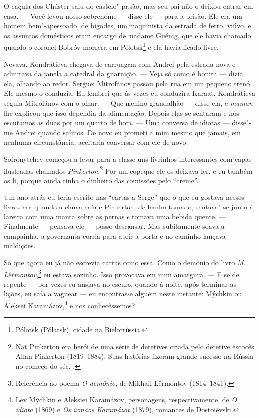 O caçula dos Chúster saiu do castelo"-prisão, mas seu pai não o deixou
entrar em casa. --- Você levou nosso sobrenome --- disse ele --- para a
prisão. Ele era um homem bem"-apessoado, de bigodes, um maquinista da
estrada de ferro, viúvo, e os assuntos domésticos eram encargo de madame
Guénig, que ele havia chamado quando o coronel Bobróv morrera em
Pólotsk\footnote{Pólotsk (Pólatsk), cidade na Bielorrússia.} e ela havia
ficado livre.

Nevava. Kondrátieva chegava de carruagem com Andrei pela estrada nova e
admirava da janela a catedral da guarnição. --- Veja só como é bonita
--- dizia ela, olhando ao redor. Serguei Mitrofánov passou pela rua em
um pequeno trenó. Ele mesmo o conduzia. Eu lembrei que às vezes eu
conduzira Karaat. Kondrátieva seguia Mitrofánov com o olhar. --- Que
menino grandalhão --- disse ela, e \emph{maman} lhe explicou que isso
dependia da alimentação. Depois elas se sentaram e nós escutamos as duas
por um quarto de hora. --- Uma conversa de idiotas --- disse"-me Andrei
quando saímos. De novo eu prometi a mim mesmo que jamais, em nenhuma
circunstância, aceitaria conversar com ele de novo.

Sofrónytchev começou a levar para a classe uns livrinhos interessantes
com capas ilustradas chamados \emph{Pinkerton}.\footnote{Nat Pinkerton
  era herói de uma série de detetives criada pelo detetive escocês Allan
  Pinkerton (1819--1884). Suas histórias fizeram grande sucesso na
  Rússia no começo do séc. \scalebox{.8}{XX}.} Por um copeque ele os deixava ler, e eu
também os li, porque ainda tinha o dinheiro das comissões pelo
``creme''.

Um ano atrás eu teria escrito nas ``cartas a Serge'' que o que eu
gostava nesses livros era quando a chuva caía e Pinkerton, de banho
tomado, sentava"-se junto à lareira com uma manta sobre as pernas e
tomava uma bebida quente. --- Finalmente --- pensava ele --- posso
descansar. Mas subitamente soava a campainha, a governanta corria para
abrir a porta e no caminho lançava maldições.

Só que agora eu já não escrevia cartas como essa. Como o demônio do
livro \emph{M. Lêrmontov},\footnote{Referência ao poema \emph{O
  demônio}, de Mikhail Lêrmontov (1814--1841).} eu estava sozinho. Isso
provocava em mim amargura. --- E se de repente --- por vezes eu ansiava
no escuro, quando à noite, após terminar as lições, eu saía a vaguear
--- eu encontrasse alguém neste instante: Mýchkin ou Aleksei
Karamázov,\footnote{Lev Mýchkin e Aleksiei Karamázov, personagens,
  respectivamente, de \emph{O idiota} (1869) e \emph{Os irmãos
  Karamázov} (1879), romances de Dostoiévski.} e nos
conhecêssemos?

